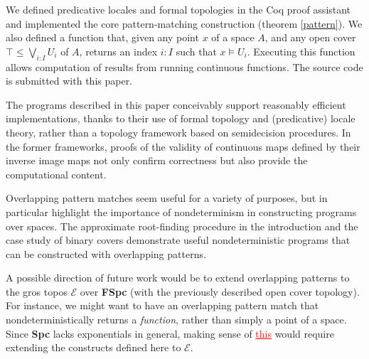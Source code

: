 \documentclass[conference]{IEEEtran}
\newcommand{\grammar}[1]{\textcolor{red}{\underline{#1}}}
\begin{document}
We defined predicative locales and formal topologies in the Coq proof assistant and implemented the core pattern-matching construction (theorem \ref{pattern}). We also defined a function that, given any point $x$ of a space $A$, and any open cover $\top \le \bigvee_{i : I} U_i$ of $A$, returns an index $i : I$ such that $x \models U_i$. Executing this function allows computation of results from running continuous functions. The source code is submitted with this paper.

The programs described in this paper conceivably support reasonably efficient implementations, thanks to their use of formal topology and (predicative) locale theory, rather than a topology framework based on semidecision procedures. In the former frameworks, proofs of the validity of continuous maps defined by their inverse image maps not only confirm correctness but also provide the computational content.

Overlapping pattern matches seem useful for a variety of purposes, but in particular highlight the  importance of nondeterminism in constructing programs over spaces. The approximate root-finding procedure in the introduction and the case study of binary covers demonstrate useful nondeterministic programs that can be constructed with overlapping patterns.

A possible direction of future work would be to extend overlapping patterns to the gros topos $\mathcal{E}$ over \textbf{FSpc} (with the previously described open cover topology). For instance, we might want to have an overlapping pattern match that nondeterministically returns a \emph{function}, rather than simply a point of a space. Since \textbf{Spc} lacks exponentials in general, making sense of \grammar{this} would require extending the constructs defined here to $\mathcal{E}$.









\end{document}
